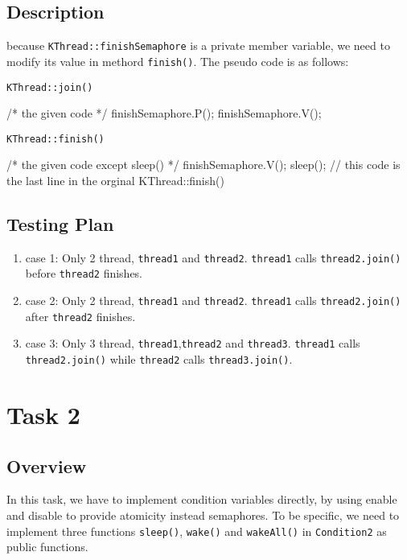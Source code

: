 \documentclass{article}
\begin{document}
\begin{spacing}{1.1}
\begin{enumerate}
    \end{enumerate}

    \subsection{Description}
    because \texttt{KThread::finishSemaphore} is a private
    member variable, we need to modify its value in methord \texttt{finish()}.  
    The pseudo code is as follows:
    \begin{algorithm}
      \caption{\texttt{KThread::join()}}
      \begin{algorithmic}[1]
	\STATE /* the given code */
	\STATE finishSemaphore.P();
	\STATE finishSemaphore.V();
      \end{algorithmic}
    \end{algorithm}

    \begin{algorithm}
      \caption{\texttt{KThread::finish()}}
      \begin{algorithmic}[1]
	\STATE /* the given code except sleep() */
	\STATE finishSemaphore.V();
	\STATE sleep(); // this code is the last line in the orginal KThread::finish()
      \end{algorithmic}
    \end{algorithm}

    \subsection{Testing Plan}
    \begin{enumerate}
      \item[] case 1: Only 2 thread, \texttt{thread1} and \texttt{thread2}. 
	\texttt{thread1} calls \texttt{thread2.join()} before \texttt{thread2} finishes.
      \item[] case 2: Only 2 thread, \texttt{thread1} and \texttt{thread2}.
	\texttt{thread1} calls \texttt{thread2.join()} after \texttt{thread2} finishes.
      \item[] case 3: Only 3 thread, \texttt{thread1},\texttt{thread2} and
	\texttt{thread3}. \texttt{thread1} calls \texttt{thread2.join()} while
	\texttt{thread2} calls \texttt{thread3.join()}.
    \end{enumerate}

    \section{Task 2}
    \subsection{Overview}
    In this task, we have to implement condition variables directly, by using enable and disable to provide atomicity instead semaphores. To be specific, we need to implement three functions \texttt{sleep()}, \texttt{wake()} and \texttt{wakeAll()} in \texttt{Condition2} as public functions.


\end{spacing}
\end{document}
